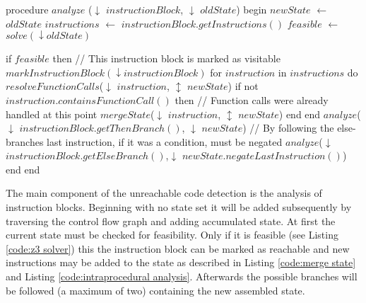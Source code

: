 \begin{program}[h!]
	\begin{GenericCode}
procedure $analyze$ ($\downarrow$ $instructionBlock$, $\downarrow$ $oldState$) begin
	$newState$ $\leftarrow$ $oldState$
	$instructions$ $\leftarrow$ $instructionBlock.getInstructions()$
	$feasible$ $\leftarrow$ $solve(\downarrow oldState)$
		
	if $feasible$ then
		// This instruction block is marked as visitable
		$markInstructionBlock(\downarrow instructionBlock)$ 
		for $instruction$ in $instructions$ do
			$resolveFunctionCalls$($\downarrow$ $instruction$, $\updownarrow$ $newState$)	
			if not $instruction.containsFunctionCall()$ then
				// Function calls were already handled at this point
				$mergeState$($\downarrow$ $instruction$, $\updownarrow$ $newState$)
			end 
		end
		$analyze$($\downarrow$ $instructionBlock.getThenBranch()$, $\downarrow$ $newState$)
		// By following the else-branches last instruction, if it was a condition, must be negated
		$analyze$($\downarrow$ $instructionBlock.getElseBranch()$,$\downarrow$ $newState.negateLastInstruction()$)
	end
end	\end{GenericCode}

	\caption{The main component of the unreachable code detection is the analysis of instruction blocks. Beginning with no state set it will be added subsequently by traversing the control flow graph and adding accumulated state. 
	At first the current state must be checked for feasibility. Only if it is feasible (see Listing \ref{code:z3 solver}) this the instruction block can be marked as reachable and new instructions may be added to the state as described in Listing \ref{code:merge state} and Listing \ref{code:intraprocedural analysis}.	
	Afterwards the possible branches will be followed (a maximum of two) containing the new assembled state.}
	\label{code:instruction block analyzer}
\end{program}

